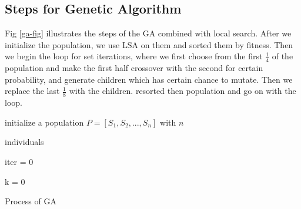 \documentclass{llncs}
\begin{document}
\subsection{Steps for Genetic Algorithm}
Fig \ref{ga-fig} illustrates the steps of the GA combined with local search. After we initialize the population, we use LSA on them and sorted them by fitness. Then we begin the loop for set iterations, where we first choose from the first $\frac{1}{4}$ of the population and make the first half crossover with the second for certain probability, and generate children which has certain chance to mutate. Then we replace the last $\frac{1}{8}$ with the children.
resorted then population and go on with the loop.


\begin{minipage}[t]{0.80\textwidth}
       \begin{algorithm}[H]
           initialize a population $P = [S_1, S_2, ..., S_n]$ with $n$
           
           individuals
           
           iter = 0
           
           k = 0
           
           
           \caption{Process of GA}
        \end{algorithm}
        \end{minipage} 
\end{document}

